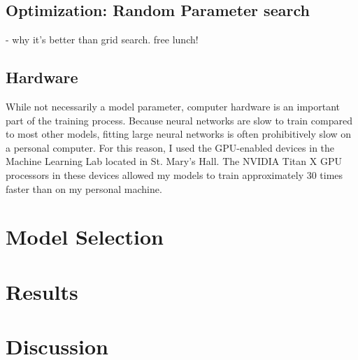 \documentclass[12pt]{article}  %
\theoremstyle{definition}
\theoremstyle{remark}
\begin{document}
\subsection{Optimization: Random Parameter search}
- why it's better than grid search. free lunch!
\subsection{Hardware}
\par While not necessarily a model parameter, computer hardware is an important part of the training process. Because neural networks are slow to train compared to most other models, fitting large neural networks is often prohibitively slow on a personal computer. For this reason, I used the GPU-enabled devices in the Machine Learning Lab located in St. Mary's Hall. The NVIDIA Titan X GPU processors in these devices allowed my models to train approximately 30 times faster than on my personal machine. 

\section{Model Selection}

\section{Results}

\section{Discussion}




\end{document}
